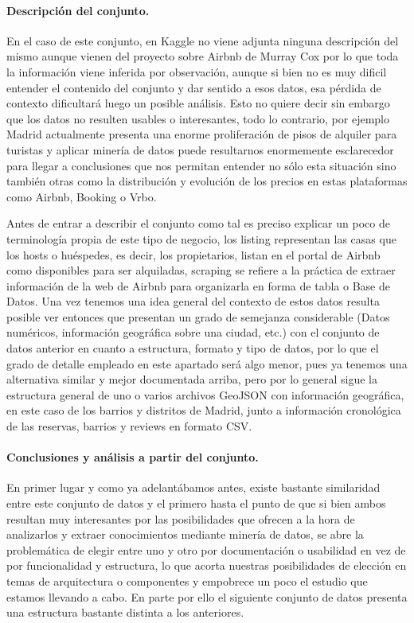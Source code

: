 \documentclass[11pt, a4paper]{article} %
\begin{document}
\paragraph{Descripción del conjunto.}
En el caso de este conjunto, en Kaggle no viene adjunta ninguna descripción del mismo aunque vienen del proyecto sobre Airbnb de Murray Cox \cite{airbnb} por lo que toda la información viene inferida por observación, aunque si bien no es muy dificil entender el contenido del conjunto y dar sentido a esos datos, esa pérdida de contexto dificultará luego un posible análisis. Esto no quiere decir sin embargo que los datos no resulten usables o interesantes, todo lo contrario, por ejemplo Madrid actualmente presenta una enorme proliferación de pisos de alquiler para turistas y aplicar minería de datos puede resultarnos enormemente esclarecedor para llegar a conclusiones que nos permitan entender no sólo esta situación sino también otras como la distribución y evolución de los precios en estas plataformas como Airbnb, Booking o Vrbo.


Antes de entrar a describir el conjunto como tal es preciso explicar un poco de terminología propia de este tipo de negocio, los listing representan las casas que los hosts o huéspedes, es decir, los propietarios, listan en el portal de Airbnb como disponibles para ser alquiladas, scraping se refiere a la práctica de extraer información de la web de Airbnb para organizarla en forma de tabla o Base de Datos. Una vez tenemos una idea general del contexto de estos datos resulta posible ver entonces que presentan un grado de semejanza considerable (Datos numéricos, información geográfica sobre una ciudad, etc.) con el conjunto de datos anterior en cuanto a estructura, formato y tipo de datos, por lo que el grado de detalle empleado en este apartado será algo menor, pues ya tenemos una alternativa similar y mejor documentada arriba, pero por lo general sigue la estructura general de uno o varios archivos GeoJSON con información geográfica, en este caso de los barrios y distritos de Madrid, junto a información cronológica de las reservas, barrios y reviews en formato CSV.
\paragraph{Conclusiones y análisis a partir del conjunto.}
En primer lugar y como ya adelantábamos antes, existe bastante similaridad entre este conjunto de datos y el primero hasta el punto de que si bien ambos resultan muy interesantes por las posibilidades que ofrecen a la hora de analizarlos y extraer conocimientos mediante minería de datos, se abre la problemática de elegir entre uno y otro por documentación o usabilidad en vez de por funcionalidad y estructura, lo que acorta nuestras posibilidades de elección en temas de arquitectura o componentes y empobrece un poco el estudio que estamos llevando a cabo. En parte por ello el siguiente conjunto de datos presenta una estructura bastante distinta a los anteriores.
\end{document}
